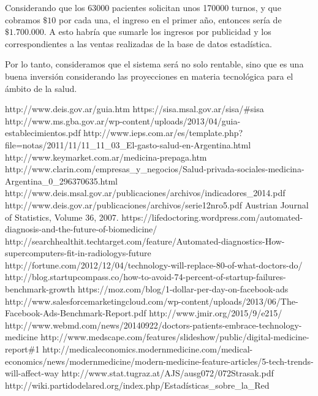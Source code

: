 \documentclass[a4paper,10pt]{article}
\begin{document}
Considerando que los 63000 pacientes solicitan unos 170000 turnos, y que cobramos $\$ 10$ por cada una, el ingreso en el primer año, entonces sería de $\$ 1.700.000$. A esto habría que sumarle los ingresos por publicidad y los correspondientes a las ventas realizadas de la base de datos estadística.

Por lo tanto, consideramos que el sistema será no solo rentable, sino que es una buena inversión considerando las proyecciones en materia tecnológica para el ámbito de la salud.

\begin{thebibliography}{21}%
 http://www.deis.gov.ar/guia.htm 
 https://sisa.msal.gov.ar/sisa/\#sisa 
 http://www.ms.gba.gov.ar/wp-content/uploads/2013/04/guia-establecimientos.pdf
 http://www.ieps.com.ar/es/template.php?file=notas/2011/11/11\_11\_03\_El-gasto-salud-en-Argentina.html
 http://www.keymarket.com.ar/medicina-prepaga.htm
 http://www.clarin.com/empresas\_y\_negocios/Salud-privada-sociales-medicina-Argentina\_0\_296370635.html
 http://www.deis.msal.gov.ar/publicaciones/archivos/indicadores\_2014.pdf 
 http://www.deis.gov.ar/publicaciones/archivos/serie12nro5.pdf 
 Austrian Journal of Statistics, Volume 36, 2007.
 https://lifedoctoring.wordpress.com/automated-diagnosis-and-the-future-of-biomedicine/
 http://searchhealthit.techtarget.com/feature/Automated-diagnostics-How-supercomputers-fit-in-radiologys-future
 http://fortune.com/2012/12/04/technology-will-replace-80-of-what-doctors-do/
 http://blog.startupcompass.co/how-to-avoid-74-percent-of-startup-failures-benchmark-growth
 https://moz.com/blog/1-dollar-per-day-on-facebook-ads
 http://www.salesforcemarketingcloud.com/wp-content/uploads/2013/06/The-Facebook-Ads-Benchmark-Report.pdf
 http://www.jmir.org/2015/9/e215/ 
 http://www.webmd.com/news/20140922/doctors-patients-embrace-technology-medicine
 http://www.medscape.com/features/slideshow/public/digital-medicine-report\#1
 http://medicaleconomics.modernmedicine.com/medical-economics/news/modernmedicine/modern-medicine-feature-articles/5-tech-trends-will-affect-way
 http://www.stat.tugraz.at/AJS/ausg072/072Strasak.pdf
 http://wiki.partidodelared.org/index.php/Estadísticas\_sobre\_la\_Red

\end{thebibliography}
\end{document}
